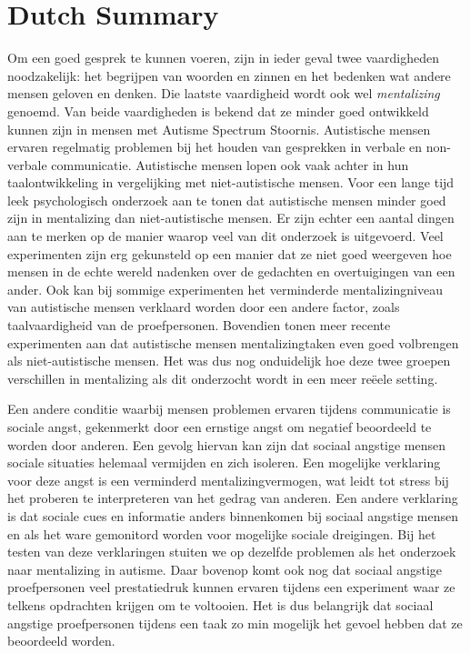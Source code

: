 {}
\section*{Dutch Summary}

Om een goed gesprek te kunnen voeren, zijn in ieder geval twee vaardigheden noodzakelijk: het begrijpen van woorden en zinnen en het bedenken wat andere mensen geloven en denken. Die laatste vaardigheid wordt ook wel \emph{mentalizing} genoemd. Van beide vaardigheden is bekend dat ze minder goed ontwikkeld kunnen zijn in mensen met Autisme Spectrum Stoornis. Autistische mensen ervaren regelmatig problemen bij het houden van gesprekken in verbale en non-verbale communicatie. Autistische mensen lopen ook vaak achter in hun taalontwikkeling in vergelijking met niet-autistische mensen. Voor een lange tijd leek psychologisch onderzoek aan te tonen dat autistische mensen minder goed zijn in mentalizing dan niet-autistische mensen. Er zijn echter een aantal dingen aan te merken op de manier waarop veel van dit onderzoek is uitgevoerd. Veel experimenten zijn erg gekunsteld op een manier dat ze niet goed weergeven hoe mensen in de echte wereld nadenken over de gedachten en overtuigingen van een ander. Ook kan bij sommige experimenten het verminderde mentalizingniveau van autistische mensen verklaard worden door een andere factor, zoals taalvaardigheid van de proefpersonen. Bovendien tonen meer recente experimenten aan dat autistische mensen mentalizingtaken even goed volbrengen als niet-autistische mensen. Het was dus nog onduidelijk hoe deze twee groepen verschillen in mentalizing als dit onderzocht wordt in een meer re\"eele setting.

Een andere conditie waarbij mensen problemen ervaren tijdens communicatie is sociale angst, gekenmerkt door een ernstige angst om negatief beoordeeld te worden door anderen. Een gevolg hiervan kan zijn dat sociaal angstige mensen sociale situaties helemaal vermijden en zich isoleren. Een mogelijke verklaring voor deze angst is een verminderd mentalizingvermogen, wat leidt tot stress bij het proberen te interpreteren van het gedrag van anderen. Een andere verklaring is dat sociale cues en informatie anders binnenkomen bij sociaal angstige mensen en als het ware gemonitord worden voor mogelijke sociale dreigingen. Bij het testen van deze verklaringen stuiten we op dezelfde problemen als het onderzoek naar mentalizing in autisme. Daar bovenop komt ook nog dat sociaal angstige proefpersonen veel prestatiedruk kunnen ervaren tijdens een experiment waar ze telkens opdrachten krijgen om te voltooien. Het is dus belangrijk dat sociaal angstige proefpersonen tijdens een taak zo min mogelijk het gevoel hebben dat ze beoordeeld worden.

